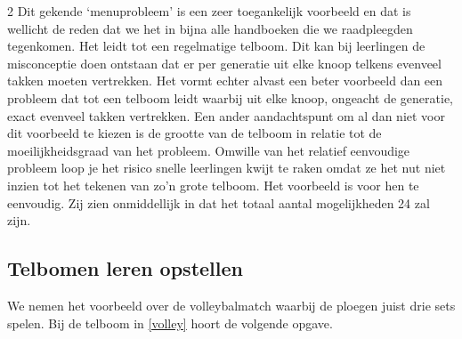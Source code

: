\begin{multicols}{2}
Dit gekende ‘menuprobleem’ is een zeer toegankelijk voorbeeld en dat is wellicht de reden dat we het in bijna alle handboeken die we raadpleegden tegenkomen. Het leidt tot een regelmatige telboom. Dit kan bij leerlingen de misconceptie doen ontstaan dat er per generatie uit elke knoop telkens evenveel takken moeten vertrekken. Het vormt echter alvast een beter voorbeeld dan een probleem dat tot een telboom leidt waarbij uit elke knoop, ongeacht de generatie, exact evenveel takken vertrekken. Een ander aandachtspunt om al dan niet voor dit voorbeeld te kiezen is de grootte van de telboom in relatie tot de moeilijkheidsgraad van het probleem. Omwille van het relatief eenvoudige probleem loop je het risico snelle leerlingen kwijt te raken omdat ze het nut niet inzien tot het tekenen van zo’n grote telboom. Het voorbeeld is voor hen te eenvoudig. Zij zien onmiddellijk in dat het totaal aantal mogelijkheden 24 zal zijn. 

\subsection{Telbomen leren opstellen}

We nemen het voorbeeld over de volleybalmatch waarbij de ploegen juist drie sets spelen. Bij de telboom in \autoref{volley} hoort de volgende opgave.

\end{multicols}
 


